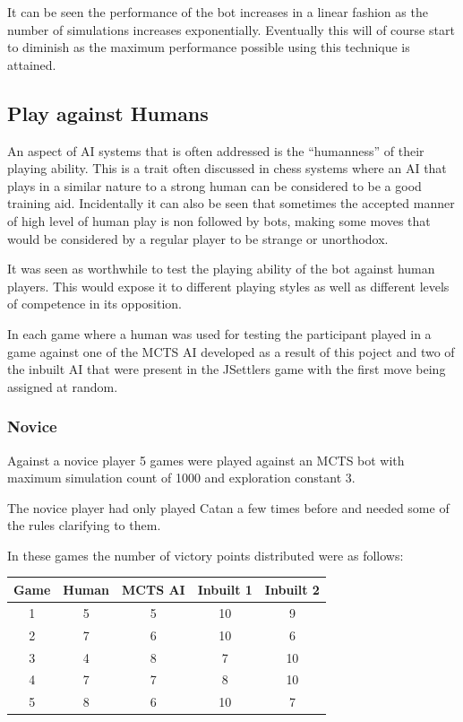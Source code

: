 \documentclass[]{article}
\begin{document}
\par It can be seen the performance of the bot increases in a linear fashion as the number of simulations increases exponentially. Eventually this will of course start to diminish as the maximum performance possible using this technique is attained.

\subsection{Play against Humans}
 
An aspect of AI systems that is often addressed is the ``humanness'' of their playing ability. This is a trait often discussed in chess systems where an AI that plays in a similar nature to a strong human can be considered to be a good training aid. Incidentally it can also be seen that sometimes the accepted manner of high level of human play is non followed by bots, making some moves that would be considered by a regular player to be strange or unorthodox. 

\par It was seen as worthwhile to test the playing ability of the bot against human players. This would expose it to different playing styles as well as different levels of competence in its opposition. 

\par In each game where a human was used for testing the participant played in a game against one of the MCTS AI developed as a result of this poject and two of the inbuilt AI that were present in the JSettlers game with the first move being assigned at random.

\subsubsection{Novice}
Against a novice player 5 games were played against an MCTS bot with maximum simulation count of 1000 and exploration constant 3.

\par The novice player had only played Catan a few times before and needed some of the rules clarifying to them.

In these games the number of victory points distributed were as follows:

\begin{center}
\begin{tabular}{|c||c|c|c|c|}
\hline
Game & Human & MCTS AI & Inbuilt 1 & Inbuilt 2\\
\hline
1 & 5 & 5 & 10 & 9 \\
\hline
2 & 7 & 6 & 10 & 6 \\
\hline
3 & 4 & 8 & 7 & 10\\
\hline
4 & 7 & 7 & 8 & 10 \\
\hline
5 & 8 & 6 & 10 & 7 \\
\hline
\end{tabular}
\end{center}
\end{document}
